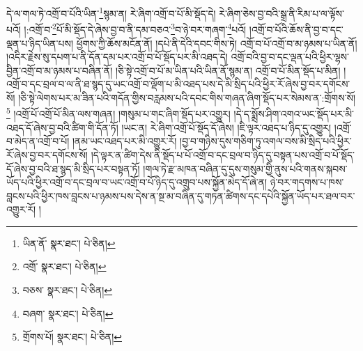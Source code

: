 དེ་ལ་གལ་ཏེ་འགྲོ་བ་པོའི་ཡིན་\footnote{ཡིན་ནོ་  སྣར་ཐང་།  པེ་ཅིན། }སྙམ་ན། རེ་ཞིག་འགྲོ་བ་པོ་མི་སྡོད་དེ། རེ་ཞིག་ཅེས་བྱ་བའི་སྒྲ་ནི་རིམ་པ་ལ་ལྟོས་པའོ། །:འགྲོ་བ་\footnote{འགྲོ་  སྣར་ཐང་།  པེ་ཅིན། }པོ་མི་སྡོད་དེ་ཞེས་བྱ་བ་ནི་དམ་བཅའ་\footnote{བཅས་  སྣར་ཐང་།  པེ་ཅིན། }བ་ཉེ་བར་གཞག་\footnote{བཞག་  སྣར་ཐང་།  པེ་ཅིན། }པའོ། །འགྲོ་བ་པོའི་ཆོས་ནི་བྱ་བ་དང་ལྡན་པ་ཉིད་ཡིན་པས། ཕྱོགས་ཀྱི་ཆོས་མངོན་ནོ། །དཔེ་ནི་དེའི་དབང་གིས་ཏེ། འགྲོ་བ་པོ་འགྲོ་བ་མ་ཉམས་པ་ཡིན་ནོ། །འདིར་རྗེས་སུ་དཔག་པ་ནི་དོན་དམ་པར་འགྲོ་བ་པོ་སྡོད་པར་མི་འཐད་དེ། འགྲོ་བའི་བྱ་བ་དང་ལྡན་པའི་ཕྱིར་ལྷས་བྱིན་འགྲོ་བ་མ་ཉམས་པ་བཞིན་ནོ། །ཅི་སྟེ་འགྲོ་བ་པོ་མ་ཡིན་པའི་ཡིན་ནོ་སྙམ་ན། འགྲོ་བ་པོ་མིན་སྡོད་པ་མིན། །འགྲོ་བ་དང་བྲལ་བ་ལ་ནི་ཐ་སྙད་དུ་ཡང་འགྲོ་བ་ལྡོག་པ་མི་འཐད་པས་དེ་མི་སྲིད་པའི་ཕྱིར་རོ་ཞེས་བྱ་བར་དགོངས་སོ། །ཅི་སྟེ་ལེགས་པར་མ་ཟིན་པའི་གདོན་གྱིས་བརླམས་པའི་དབང་གིས་གཞན་ཞིག་སྡོད་པར་སེམས་ན་:གྲོགས་སོ།\footnote{གྲོགས་པོ།  སྣར་ཐང་།  པེ་ཅིན། } །འགྲོ་པོ་འགྲོ་པོ་མིན་ལས་གཞན། །གསུམ་པ་གང་ཞིག་སྡོད་པར་འགྱུར། །དེ་ད་སྨྲོས་ཤིག་འགའ་ཡང་སྡོད་པར་མི་འཐད་དོ་ཞེས་བྱ་བའི་ཚིག་གི་དོན་ཏོ། །ཡང་ན། རེ་ཞིག་འགྲོ་པོ་སྡོད་དོ་ཞེས། །ཇི་ལྟར་འཐད་པ་ཉིད་དུ་འགྱུར། །འགྲོ་བ་མེད་ན་འགྲོ་བ་པོ། །ནམ་ཡང་འཐད་པར་མི་འགྱུར་རོ། །བྱ་བ་གཉིས་དུས་གཅིག་ཏུ་འགལ་བས་མི་སྲིད་པའི་ཕྱིར་རོ་ཞེས་བྱ་བར་དགོངས་སོ། །དེ་ལྟར་ན་ཚིག་དེས་ནི་སྡོད་པ་པོ་འགྲོ་བ་དང་བྲལ་བ་ཉིད་དུ་བསྟན་པས་འགྲོ་བ་པོ་སྡོད་དོ་ཞེས་བྱ་བའི་ཐ་སྙད་མི་སྲིད་པར་བསྟན་ཏོ། །གལ་ཏེ་རྫ་མཁན་བཞིན་དུ་དུས་གསུམ་གྱི་ནུས་པའི་གནས་སྐབས་ཡོད་པའི་ཕྱིར་འགྲོ་བ་དང་བྲལ་བ་ཡང་འགྲོ་བ་པོ་ཉིད་དུ་འགྲུབ་པས་སྐྱོན་མེད་དོ་ཞེ་ན། ཉེ་བར་གདགས་པ་ཁས་བླངས་པའི་ཕྱིར་ཁས་བླངས་པ་ཉམས་པས་དེས་ན་སྔ་མ་བཞིན་དུ་གཏན་ཚིགས་དང་དཔེའི་སྐྱོན་ཡོད་པར་ཐལ་བར་འགྱུར་རོ། །
